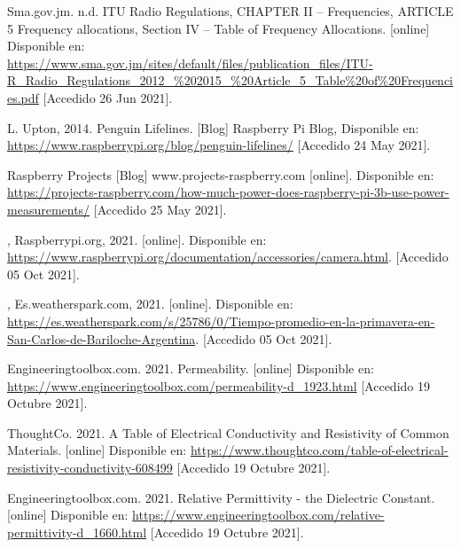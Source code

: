 \begin{flushleft}
\begin{thebibliography}{9}
Sma.gov.jm. n.d. ITU Radio Regulations, CHAPTER II – Frequencies, ARTICLE 5 Frequency allocations, Section IV – Table of Frequency Allocations. [online] Disponible en: \href{https://www.sma.gov.jm/sites/default/files/publication_files/ITU-R_Radio_Regulations_2012_\%202015_\%20Article_5_Table\%20of\%20Frequencies.pdf}{https://www.sma.gov.jm/sites/default/files/publication\_files/ITU-R\_Radio\_Regulations\_2012\_\%202015\_\%20Article\_5\_Table\%20of\%20Frequencies.pdf} [Accedido 26 Jun 2021].

L. Upton, 2014. Penguin Lifelines. [Blog] Raspberry Pi Blog, Disponible en: \href{https://www.raspberrypi.org/blog/penguin-lifelines/}{https://www.raspberrypi.org/blog/penguin-lifelines/} [Accedido 24 May 2021].

Raspberry Projects [Blog] www.projects-raspberry.com [online]. Disponible en: \href{https://projects-raspberry.com/how-much-power-does-raspberry-pi-3b-use-power-measurements/}{https://projects-raspberry.com/how-much-power-does-raspberry-pi-3b-use-power-measurements/} [Accedido 25 May 2021].

, Raspberrypi.org, 2021. [online]. Disponible en: \href{https://www.raspberrypi.org/documentation/accessories/camera.html}{https://www.raspberrypi.org/documentation/accessories/camera.html}. [Accedido 05  Oct 2021].

, Es.weatherspark.com, 2021. [online]. Disponible en: \href{https://es.weatherspark.com/s/25786/0/Tiempo-promedio-en-la-primavera-en-San-Carlos-de-Bariloche-Argentina}{https://es.weatherspark.com/s/25786/0/Tiempo-promedio-en-la-primavera-en-San-Carlos-de-Bariloche-Argentina}. [Accedido 05 Oct 2021].

Engineeringtoolbox.com. 2021. Permeability. [online] Disponible en: \href{https://www.engineeringtoolbox.com/permeability-d\_1923.html}{https://www.engineeringtoolbox.com/permeability-d\_1923.html} [Accedido 19 Octubre 2021].

ThoughtCo. 2021. A Table of Electrical Conductivity and Resistivity of Common Materials. [online] Disponible en: \href{https://www.thoughtco.com/table-of-electrical-resistivity-conductivity-608499}{https://www.thoughtco.com/table-of-electrical-resistivity-conductivity-608499} [Accedido 19 Octubre 2021].

Engineeringtoolbox.com. 2021. Relative Permittivity - the Dielectric Constant. [online] Disponible en: \href{https://www.engineeringtoolbox.com/relative-permittivity-d\_1660.html}{https://www.engineeringtoolbox.com/relative-permittivity-d\_1660.html} [Accedido 19 Octubre 2021].



\end{thebibliography}
\end{flushleft}

%
